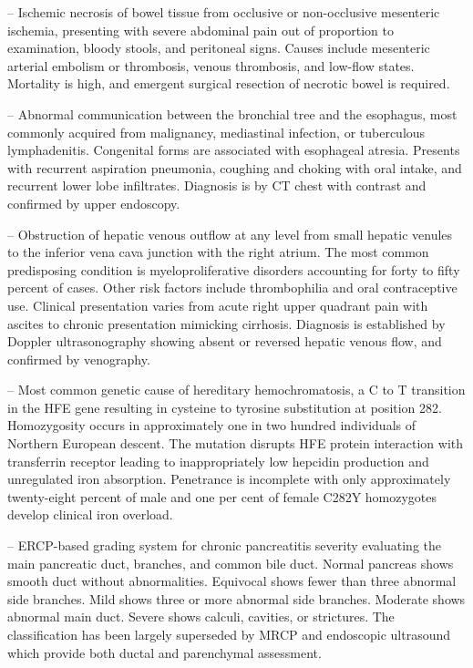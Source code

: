 -- Ischemic necrosis of bowel tissue from occlusive or non-occlusive mesenteric ischemia, presenting with severe abdominal pain out of proportion to examination, bloody stools, and peritoneal signs. Causes include mesenteric arterial embolism or thrombosis, venous thrombosis, and low-flow states. Mortality is high, and emergent surgical resection of necrotic bowel is required.

-- Abnormal communication between the bronchial tree and the esophagus, most commonly acquired from malignancy, mediastinal infection, or tuberculous lymphadenitis. Congenital forms are associated with esophageal atresia. Presents with recurrent aspiration pneumonia, coughing and choking with oral intake, and recurrent lower lobe infiltrates. Diagnosis is by CT chest with contrast and confirmed by upper endoscopy.

-- Obstruction of hepatic venous outflow at any level from small hepatic venules to the inferior vena cava junction with the right atrium. The most common predisposing condition is myeloproliferative disorders accounting for forty to fifty percent of cases. Other risk factors include thrombophilia and oral contraceptive use. Clinical presentation varies from acute right upper quadrant pain with ascites to chronic presentation mimicking cirrhosis. Diagnosis is established by Doppler ultrasonography showing absent or reversed hepatic venous flow, and confirmed by venography.

-- Most common genetic cause of hereditary hemochromatosis, a C to T transition in the HFE gene resulting in cysteine to tyrosine substitution at position 282. Homozygosity occurs in approximately one in two hundred individuals of Northern European descent. The mutation disrupts HFE protein interaction with transferrin receptor leading to inappropriately low hepcidin production and unregulated iron absorption. Penetrance is incomplete with only approximately twenty-eight percent of male and one per cent of female C282Y homozygotes develop clinical iron overload.

-- ERCP-based grading system for chronic pancreatitis severity evaluating the main pancreatic duct, branches, and common bile duct. Normal pancreas shows smooth duct without abnormalities. Equivocal shows fewer than three abnormal side branches. Mild shows three or more abnormal side branches. Moderate shows abnormal main duct. Severe shows calculi, cavities, or strictures. The classification has been largely superseded by MRCP and endoscopic ultrasound which provide both ductal and parenchymal assessment.


